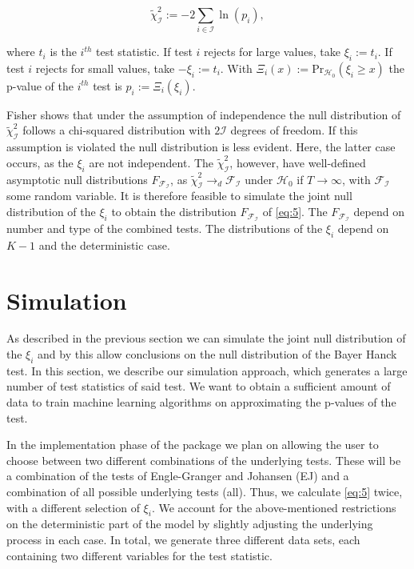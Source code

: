 \documentclass[12pt,a4paper]{article}
\begin{document}
\begin{equation}
\tilde{\chi}^2_{\mathcal{I}} := -2 \sum_{i \in \mathcal{I}} \ln{(p_i)},
\label{eq:5}
\end{equation}

where \(t_i\) is the \(i^{th}\) test statistic. If test \(i\) rejects
for large values, take \(\xi_i := t_i\). If test \(i\) rejects for small
values, take \(-\xi_i := t_i\). With
\(\Xi_i(x) := \text{Pr}_{\mathcal{H_0}}(\xi_i \geq x)\) the p-value of
the \(i^{th}\) test is \(p_i := \Xi_i(\xi_i)\).

Fisher shows that under the assumption of independence the null
distribution of \(\tilde{\chi}^2_{\mathcal{I}}\) follows a chi-squared
distribution with \(2\mathcal{I}\) degrees of freedom. If this
assumption is violated the null distribution is less evident. Here, the
latter case occurs, as the \(\xi_i\) are not independent. The
\(\tilde{\chi}^2_{\mathcal{I}}\), however, have well-defined asymptotic
null distributions \(F_{\mathcal{F_I}}\), as
\(\tilde{\chi}^2_{\mathcal{I}} \rightarrow_d \mathcal{F_I}\) under
\(\mathcal{H}_0\) if \(T \rightarrow \infty\), with \(\mathcal{F_I}\)
some random variable. It is therefore feasible to simulate the joint
null distribution of the \(\xi_i\) to obtain the distribution
\(F_{\mathcal{F_I}}\) of \eqref{eq:5}. The \(F_{\mathcal{F_I}}\) depend
on number and type of the combined tests. The distributions of the
\(\xi_i\) depend on \(K-1\) and the deterministic case.

\hypertarget{simulation}{%
\section{Simulation}\label{simulation}}

As described in the previous section we can simulate the joint null
distribution of the \(\xi_i\) and by this allow conclusions on the null
distribution of the Bayer Hanck test. In this section, we describe our
simulation approach, which generates a large number of test statistics
of said test. We want to obtain a sufficient amount of data to train
machine learning algorithms on approximating the p-values of the test.

In the implementation phase of the package we plan on allowing the user
to choose between two different combinations of the underlying tests.
These will be a combination of the tests of Engle-Granger and Johansen
(EJ) and a combination of all possible underlying tests (all). Thus, we
calculate \eqref{eq:5} twice, with a different selection of \(\xi_i\).
We account for the above-mentioned restrictions on the deterministic
part of the model by slightly adjusting the underlying process in each
case. In total, we generate three different data sets, each containing
two different variables for the test statistic.
\end{document}
